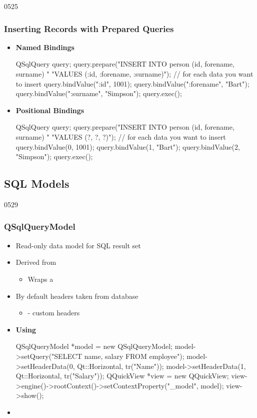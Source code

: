 \begin{slide}[fragile]{0525}\frametitle{Inserting Records with Prepared Queries}
\begin{itemize}
\item \textbf{Named Bindings}
  \begin{cpp}
QSqlQuery query;
query.prepare("INSERT INTO person (id, forename, surname) "
              "VALUES (:id, :forename, :surname)");
// for each data you want to insert
    query.bindValue(":id", 1001);
    query.bindValue(":forename", "Bart");
    query.bindValue(":surname", "Simpson");
    query.exec();  
\end{cpp}
\item \textbf{Positional Bindings}
  \begin{cpp}
QSqlQuery query;
query.prepare("INSERT INTO person (id, forename, surname) "
              "VALUES (?, ?, ?)");
// for each data you want to insert
    query.bindValue(0, 1001);
    query.bindValue(1, "Bart");
    query.bindValue(2, "Simpson");
    query.exec();
  \end{cpp}
\end{itemize}
\end{slide}

\subsection{SQL Models}

\begin{slide}[fragile]{0529}\frametitle{QSqlQueryModel}
\begin{itemize}
\item Read-only data model for SQL result set
\item Derived from 
  \begin{itemize}
  \item Wraps a 
  \end{itemize}
\item By default headers taken from database
  \begin{itemize}
  \item {} - custom headers
  \end{itemize}
\item \textbf{Using }
  \begin{cpp}
QSqlQueryModel *model = new QSqlQueryModel;
model->setQuery("SELECT name, salary FROM employee");
model->setHeaderData(0, Qt::Horizontal, tr("Name"));
model->setHeaderData(1, Qt::Horizontal, tr("Salary"));
QQuickView *view = new QQuickView;
view->engine()->rootContext()->setContextProperty("_model", model);
view->show();    
  \end{cpp}
\item {}
\end{itemize}
\end{slide}

